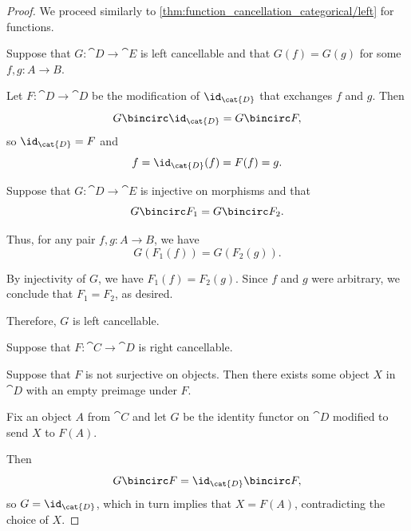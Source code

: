 \begin{proof}
   We proceed similarly to \cref{thm:function_cancellation_categorical/left} for functions.

  \SufficiencySubProof* Suppose that \( G: \cat{D} \to \cat{E} \) is left cancellable and that \( G(f) = G(g) \) for some \( f, g: A \to B \).

  Let \( F: \cat{D} \to \cat{D} \) be the modification of \( \id_{\cat{D}} \) that exchanges \( f \) and \( g \). Then
  \begin{equation*}
    G \bincirc \id_{\cat{D}} = G \bincirc F,
  \end{equation*}
  so \( \id_{\cat{D}} = F \) and
  \begin{equation*}
    f = \id_{\cat{D}}(f) = F(f) = g.
  \end{equation*}

  \NecessitySubProof* Suppose that \( G: \cat{D} \to \cat{E} \) is injective on morphisms and that
  \begin{equation*}
    G \bincirc F_1 = G \bincirc F_2.
  \end{equation*}

  Thus, for any pair \( f, g: A \to B \), we have
  \begin{equation*}
    G(F_1(f)) = G(F_2(g)).
  \end{equation*}

  By injectivity of \( G \), we have \( F_1(f) = F_2(g) \). Since \( f \) and \( g \) were arbitrary, we conclude that \( F_1 = F_2 \), as desired.

  Therefore, \( G \) is left cancellable.


  \SufficiencySubProof* Suppose that \( F: \cat{C} \to \cat{D} \) is right cancellable.

  Suppose that \( F \) is not surjective on objects. Then there exists some object \( X \) in \( \cat{D} \) with an empty preimage under \( F \).

  Fix an object \( A \) from \( \cat{C} \) and let \( G \) be the identity functor on \( \cat{D} \) modified to send \( X \) to \( F(A) \).

  Then
  \begin{equation*}
    G \bincirc F = \id_{\cat{D}} \bincirc F,
  \end{equation*}
  so \( G = \id_{\cat{D}} \), which in turn implies that \( X = F(A) \), contradicting the choice of \( X \).


\end{proof}
